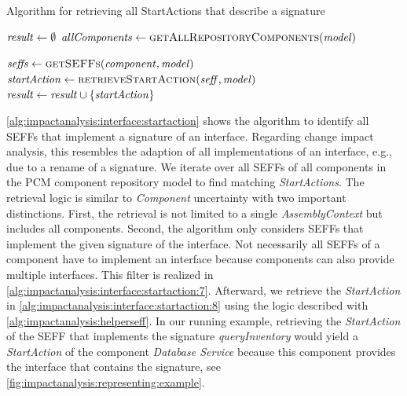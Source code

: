 \begin{algorithm}
    \caption{Algorithm for retrieving all StartActions that describe a signature}
    \label{alg:impactanalysis:interface:startaction}
    \begin{algorithmic}[1]
            \algindentskip
            \State $\mathit{result} \gets \emptyset$
            \State $\mathit{allComponents} \gets \textsc{getAllRepositoryComponents}(\mathit{model})$
            \algblockskip

                \State $\mathit{seffs} \gets \textsc{getSEFFs}(\mathit{component}, \mathit{model})$
                 
                     \label{alg:impactanalysis:interface:startaction:7}
                        \State $\mathit{startAction} \gets \textsc{retrieveStartAction}(\mathit{seff}, \mathit{model})$ \label{alg:impactanalysis:interface:startaction:8}
                        \State $\mathit{result} \gets \mathit{result} \cup \{ \mathit{startAction} \}$
                    \EndIf
                \EndFor
            \EndFor
            \algblockskip

            \State {}
            \algindentskip
        \EndProcedure   
    \end{algorithmic}
\end{algorithm}

\autoref{alg:impactanalysis:interface:startaction} shows the algorithm to identify all \acp{SEFF} that implement a signature of an interface.
Regarding change impact analysis, this resembles the adaption of all implementations of an interface, e.g., due to a rename of a signature.
We iterate over all \acp{SEFF} of all components in the \ac{PCM} component repository model to find matching \emph{StartActions}.
The retrieval logic is similar to \emph{Component} uncertainty with two important distinctions.
First, the retrieval is not limited to a single \emph{AssemblyContext} but includes all components.
Second, the algorithm only considers \acp{SEFF} that implement the given signature of the interface.
Not necessarily all \acp{SEFF} of a component have to implement an interface because components can also provide multiple interfaces.
This filter is realized in \autoref{alg:impactanalysis:interface:startaction:7}.
Afterward, we retrieve the \emph{StartAction} in \autoref{alg:impactanalysis:interface:startaction:8} using the logic described with \autoref{alg:impactanalysis:helperseff}.
In our running example, retrieving the \emph{StartAction} of the \ac{SEFF} that implements the signature \emph{queryInventory} would yield a \emph{StartAction} of the component \emph{Database Service} because this component provides the interface that contains the signature, see \autoref{fig:impactanalysis:representing:example}.

